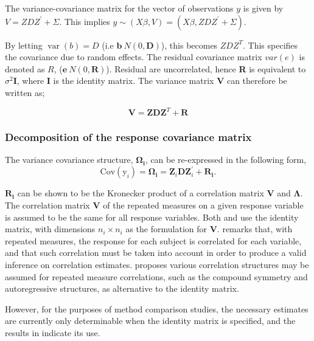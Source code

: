 \documentclass[12pt, a4paper]{report}
\theoremstyle{plain}
\theoremstyle{definition}
\theoremstyle{remark}
\begin{document}
	
	
	The variance-covariance matrix for the vector of observations $y$ is given by $V = ZDZ^{\prime}+ \Sigma.$ This implies $y \sim(X\beta, V) = (X\beta,ZDZ^{\prime}+ \Sigma)$. 
	
	
	By letting $\operatorname{var}(b) = D$ (i.e $\textbf{b} ~ N(0,\textbf{D})$), this becomes $ZDZ^{T}$. This specifies the covariance due to random
	effects. The residual covariance matrix $var(e)$ is denoted as $R$, ($\textbf{e} ~ N(0,\textbf{R})$). Residual are uncorrelated,
	hence \textbf{R} is equivalent to $\sigma^{2}$\textbf{I}, where \textbf{I} is the identity matrix. The variance matrix \textbf{V}
	can therefore be written as;
	
	\begin{equation}
	\textbf{V}  = \textbf{ZDZ}^{T} + \textbf{R}
	\end{equation}
	
	
	
	\subsubsection{Decomposition of the response covariance matrix}
	The variance covariance structure, $\boldsymbol{\Omega_{i}}$, can be re-expressed in the following form,
	\[
	\mbox{Cov}(\mbox{y}_{i}) = \boldsymbol{\Omega_{i}} = \boldsymbol{Z}_{i}\boldsymbol{D}\boldsymbol{Z}_{i}^\prime + \boldsymbol{R_{i}}.
	\]

	$\boldsymbol{R_{i}}$ can be shown to be the Kronecker product of a correlation matrix $\boldsymbol{V}$ and $\boldsymbol{\Lambda}$. The correlation matrix $\boldsymbol{V}$ of the repeated measures on a given response variable is assumed to be the same for all response variables. Both \citet{hamlett} and \citet{lam} use the identity matrix, with dimensions $n_{i} \times n_{i}$ as the formulation for $\boldsymbol{V}$. \citet{ARoy2009} remarks that, with repeated measures, the response for each subject is correlated for each variable, and that such correlation must be taken into account in order to produce a valid inference on correlation estimates.  \citet{roy2006} proposes various correlation structures may be assumed for repeated measure correlations, such as the compound symmetry and autoregressive structures, as alternative to the identity matrix.
	
	
	However, for the purposes of method comparison studies, the necessary estimates are currently only determinable when the identity matrix is specified, and the results in \citet{ARoy2009} indicate its use.
	
\end{document}
